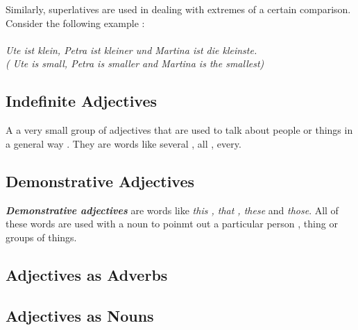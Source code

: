 \documentclass[a4paper,twocolumn,10pt]{article}
\newcommand{\subsectionend}
{
\nolinenumbers
\linenumbers
}
\begin{document}

Similarly, superlatives are used in dealing with extremes of a certain
comparison. Consider the following example :\\
\\
\textit{
Ute ist klein, Petra ist kleiner und Martina ist die kleinste.\\
\color{gray} ( Ute is small, Petra is smaller and Martina is the smallest)  \color{black}}
\\





\subsectionend

\subsection{Indefinite Adjectives}
\label{ssec:indefinite_adjectives}

A a very small group of adjectives that are used to talk about people or things
in a general way\cite{collins_german_grammar} . They are words like several ,
all , every.

\subsectionend

\subsection{Demonstrative Adjectives}
\label{ssec:demonstrative_adjectives}

\textbf{\textit{Demonstrative adjectives}} are words like \textit{this , that ,
	these} and \textit{those}. All of these words are used with a noun to poinmt
out a particular person , thing or groups of things.

\subsectionend

\subsection{Adjectives as Adverbs}
\label{ssec:adjectives_as_adverbs}


\subsectionend

\subsection{Adjectives as Nouns}
\label{ssec:adjectives_as_nouns}
\end{document}
